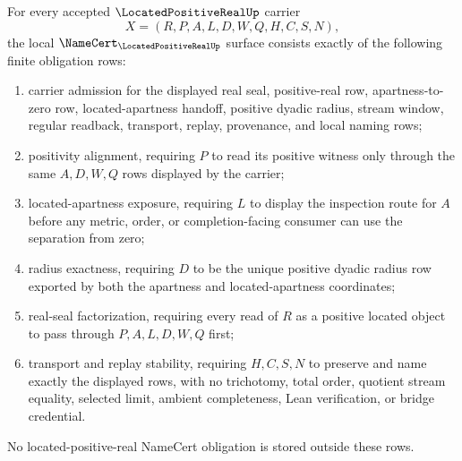 \begin{theorem}
\label{thm:located-positive-real-namecert-obligations}
For every accepted $\LocatedPositiveRealUp$ carrier
$$
X=(R,P,A,L,D,W,Q,H,C,S,N),
$$
the local $\NameCert_{\LocatedPositiveRealUp}$ surface consists exactly of the following finite obligation rows:
\begin{enumerate}
\item carrier admission for the displayed real seal, positive-real row, apartness-to-zero row, located-apartness handoff, positive dyadic radius, stream window, regular readback, transport, replay, provenance, and local naming rows;
\item positivity alignment, requiring $P$ to read its positive witness only through the same $A,D,W,Q$ rows displayed by the carrier;
\item located-apartness exposure, requiring $L$ to display the inspection route for $A$ before any metric, order, or completion-facing consumer can use the separation from zero;
\item radius exactness, requiring $D$ to be the unique positive dyadic radius row exported by both the apartness and located-apartness coordinates;
\item real-seal factorization, requiring every read of $R$ as a positive located object to pass through $P,A,L,D,W,Q$ first;
\item transport and replay stability, requiring $H,C,S,N$ to preserve and name exactly the displayed rows, with no trichotomy, total order, quotient stream equality, selected limit, ambient completeness, Lean verification, or bridge credential.
\end{enumerate}
No located-positive-real NameCert obligation is stored outside these rows.
\end{theorem}
